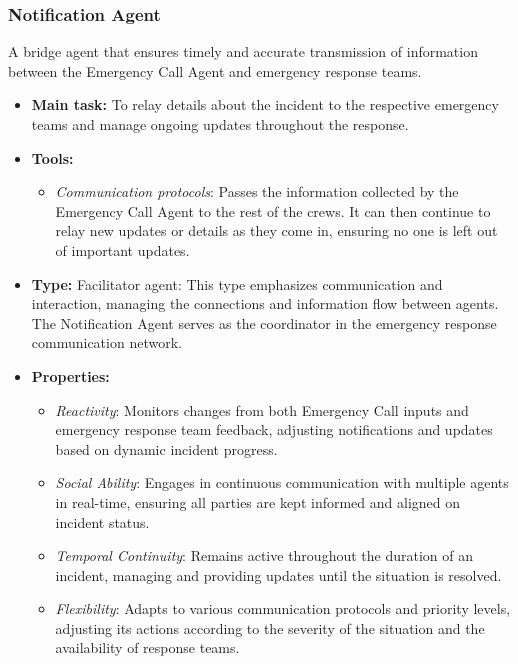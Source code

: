 \subsubsection{Notification Agent}

A bridge agent that ensures timely and accurate transmission of information between the Emergency Call Agent and emergency response teams.

\begin{itemize}
    \item \textbf{Main task:} To relay details about the incident to the respective emergency teams and manage ongoing updates throughout the response.
    \item \textbf{Tools:}
    \begin{itemize}
        \item \emph{Communication protocols}: Passes the information collected by the Emergency Call Agent to the rest of the crews. It can then continue to relay new updates or details as they come in, ensuring no one is left out of important updates.
    \end{itemize}
    \item \textbf{Type:} Facilitator agent: This type emphasizes communication and interaction, managing the connections and information flow between agents. The Notification Agent serves as the coordinator in the emergency response communication network.
    \item \textbf{Properties:}
    \begin{itemize}
        \item \emph{Reactivity}: Monitors changes from both Emergency Call inputs and emergency response team feedback, adjusting notifications and updates based on dynamic incident progress.
        \item \emph{Social Ability}: Engages in continuous communication with multiple agents in real-time, ensuring all parties are kept informed and aligned on incident status.
        \item \emph{Temporal Continuity}: Remains active throughout the duration of an incident, managing and providing updates until the situation is resolved.
        \item \emph{Flexibility}: Adapts to various communication protocols and priority levels, adjusting its actions according to the severity of the situation and the availability of response teams.
    \end{itemize}
\end{itemize}
